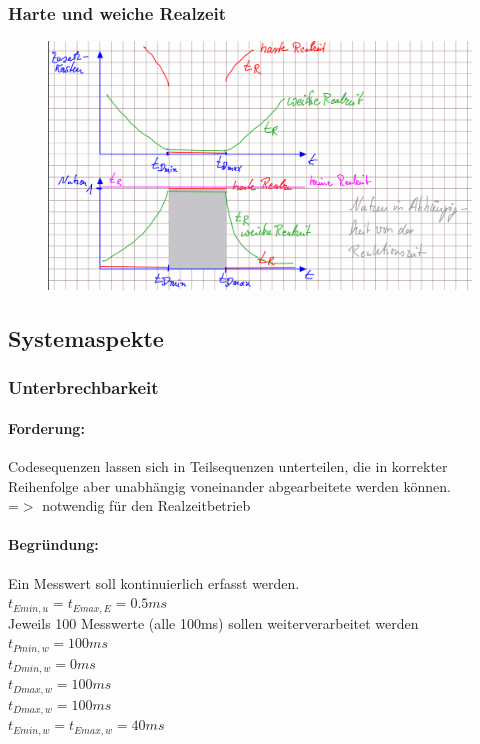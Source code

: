 \documentclass[12pt,a4paper,oneside,ngerman]{article}
\begin{document}

\subsubsection{Harte und weiche Realzeit}

\begin{figure}[H]
	\centering
	\includegraphics[scale=0.4]{umlet/harte_weiche_realzeit.png}
\end{figure}

\subsection{Systemaspekte}
\subsubsection{Unterbrechbarkeit}

\paragraph{Forderung:}
Codesequenzen lassen sich in Teilsequenzen unterteilen, die in korrekter Reihenfolge aber unabhängig voneinander abgearbeitete werden können. \\
=$>$ notwendig für den Realzeitbetrieb

\paragraph{Begründung:}
Ein Messwert soll kontinuierlich erfasst werden. \\
\(t_{Emin,u} = t_{Emax,E} = 0.5ms\) \\
Jeweils 100 Messwerte (alle 100ms) sollen weiterverarbeitet werden \\
\(t_{Pmin,w} = 100ms\) \\
\(t_{Dmin,w} = 0ms\) \\
\(t_{Dmax,w} = 100ms\) \\
\(t_{Dmax,w} = 100ms\) \\ 
\(t_{Emin,w} = t_{Emax,w} = 40ms\) \\
\end{document}
